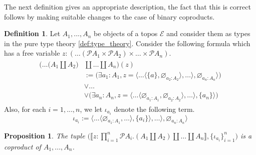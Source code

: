 \documentclass{birkjour}
\theoremstyle{plain}
\newtheorem{proposition}[thm]{Proposition}
\theoremstyle{definition}
\newtheorem{definition}[thm]{Definition} %
\newcommand{\call}[1]{\mathcal{#1}}
\begin{document}
	The next definition gives an appropriate description, the fact that this is correct follows by making suitable changes to the case of binary coproducts.
	\begin{definition}
		Let $A_1,...,A_n$ be objects of a topos $\call{E}$ and consider them as types in the pure type theory \eqref{def:type_theory}. Consider the following formula which has a free variable $z: (\hdots (\call{P} A_1 \times \call{P} A_2) \times \hdots \times \call{P}A_n)$.
		\begin{align}
			\begin{split}
				\big( \hdots \big(A_1 \coprod A_2\big) &\coprod \hdots  \coprod A_n \big)(z) \\
				&:= \big( \exists a_1: A_1, z = \langle \hdots \langle \lbrace a \rbrace, \varnothing_{a_2: A_2}\rangle, \hdots \rangle , \varnothing_{a_n: A_n}\rangle\big)\\
				&\vee \hdots\\
				&\vee \big(\exists a_n: A_n, z = \langle \hdots \langle \varnothing_{a_1: A_1}, \varnothing_{a_2: A_2}\rangle, \hdots \rangle, \lbrace a_n\rbrace\rangle\big)
			\end{split}
		\end{align}
		Also, for each $i = 1,..., n$, we let $\iota_{a_i}$ denote the following term.
		\begin{equation}
			\iota_{a_i} := \langle \hdots \langle \varnothing_{a_1:A_1}, \hdots \rangle,  \lbrace a_i\rbrace \rangle, \hdots \rangle, \varnothing_{a_n: A_n}\rangle
		\end{equation}
	\end{definition}
	\begin{proposition}
		The tuple $\big(\llbracket z: \prod_{i = 1}^n \call{P} A_i. (A_1 \coprod A_2) \coprod \hdots \coprod A_n \rrbracket, \lbrace \iota_{a_i}\rbrace_{i = 1}^n \big)$ is a coproduct of $A_1,...,A_n$.
	\end{proposition}
	
	
\end{document}
